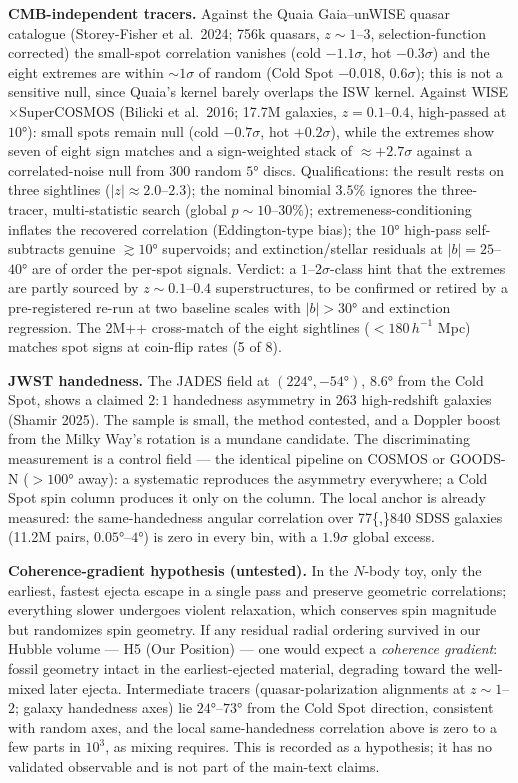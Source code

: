 \documentclass[
]{article}
\begin{document}
\textbf{CMB-independent tracers.} Against the Quaia Gaia--unWISE quasar
catalogue (Storey-Fisher et al.~2024; 756k quasars, \(z \sim 1\)--\(3\),
selection-function corrected) the small-spot correlation vanishes (cold
\(-1.1\sigma\), hot \(-0.3\sigma\)) and the eight extremes are within
\(\sim\!1\sigma\) of random (Cold Spot \(-0.018\), \(0.6\sigma\)); this
is not a sensitive null, since Quaia's kernel barely overlaps the ISW
kernel. Against WISE\(\times\)SuperCOSMOS (Bilicki et al.~2016; 17.7M
galaxies, \(z = 0.1\)--\(0.4\), high-passed at \(10°\)): small spots
remain null (cold \(-0.7\sigma\), hot \(+0.2\sigma\)), while the
extremes show seven of eight sign matches and a sign-weighted stack of
\(\approx +2.7\sigma\) against a correlated-noise null from 300 random
\(5°\) discs. Qualifications: the result rests on three sightlines
(\(|z| \approx 2.0\)--\(2.3\)); the nominal binomial \(3.5\%\) ignores
the three-tracer, multi-statistic search (global
\(p \sim 10\)--\(30\%\)); extremeness-conditioning inflates the
recovered correlation (Eddington-type bias); the \(10°\) high-pass
self-subtracts genuine \(\gtrsim 10°\) supervoids; and
extinction/stellar residuals at \(|b| = 25\)--\(40°\) are of order the
per-spot signals. Verdict: a \(1\)--\(2\sigma\)-class hint that the
extremes are partly sourced by \(z \sim 0.1\)--\(0.4\) superstructures,
to be confirmed or retired by a pre-registered re-run at two baseline
scales with \(|b| > 30°\) and extinction regression. The 2M++
cross-match of the eight sightlines (\(< 180\,h^{-1}\) Mpc) matches spot
signs at coin-flip rates (5 of 8).

\textbf{JWST handedness.} The JADES field at \((224°, -54°)\), \(8.6°\)
from the Cold Spot, shows a claimed \(2\!:\!1\) handedness asymmetry in
263 high-redshift galaxies (Shamir 2025). The sample is small, the
method contested, and a Doppler boost from the Milky Way's rotation is a
mundane candidate. The discriminating measurement is a control field ---
the identical pipeline on COSMOS or GOODS-N (\(> 100°\) away): a
systematic reproduces the asymmetry everywhere; a Cold Spot spin column
produces it only on the column. The local anchor is already measured:
the same-handedness angular correlation over 77\{,\}840 SDSS galaxies
(11.2M pairs, \(0.05°\)--\(4°\)) is zero in every bin, with a
\(1.9\sigma\) global excess.

\textbf{Coherence-gradient hypothesis (untested).} In the \(N\)-body
toy, only the earliest, fastest ejecta escape in a single pass and
preserve geometric correlations; everything slower undergoes violent
relaxation, which conserves spin magnitude but randomizes spin geometry.
If any residual radial ordering survived in our Hubble volume --- H5
(Our Position) --- one would expect a \emph{coherence gradient}: fossil
geometry intact in the earliest-ejected material, degrading toward the
well-mixed later ejecta. Intermediate tracers (quasar-polarization
alignments at \(z \sim 1\)--\(2\); galaxy handedness axes) lie
\(24°\)--\(73°\) from the Cold Spot direction, consistent with random
axes, and the local same-handedness correlation above is zero to a few
parts in \(10^3\), as mixing requires. This is recorded as a hypothesis;
it has no validated observable and is not part of the main-text claims.
\end{document}
